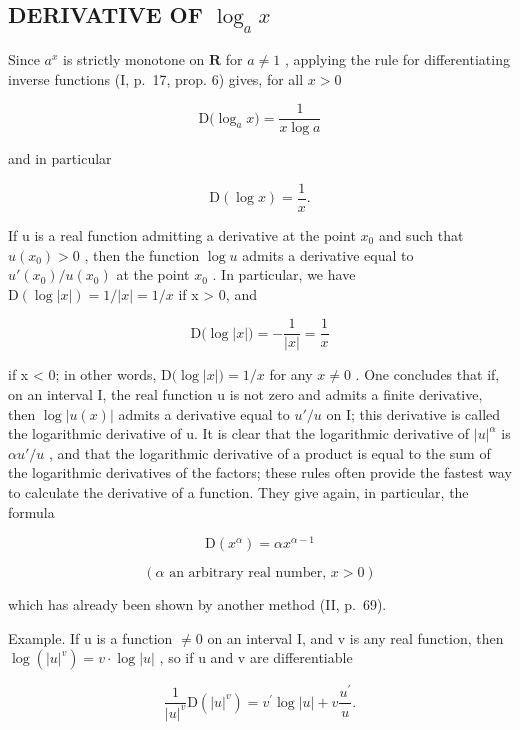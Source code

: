 \subsection{\texorpdfstring{DERIVATIVE OF \(\log_a x\)}{DERIVATIVE OF LOG BASE A OF X}}

Since \(a^x\) is strictly monotone on \(\mathbf{R}\) for \(a \neq 1\) , applying the rule for differentiating inverse functions (I, p.~17, prop. 6) gives, for all \(x > 0\)

\[
\mathrm{D} \big (\log_ {a} x \big) = \frac {1}{x \log a}\tag{9}
\]

and in particular

\[
\mathrm{D} (\log x) = \frac {1}{x}.\tag{10}
\]

If u is a real function admitting a derivative at the point \(x_{0}\) and such that \(u(x_{0}) > 0\) , then the function \(\log u\) admits a derivative equal to \(u'(x_{0})/u(x_{0})\) at the point \(x_{0}\) . In particular, we have \(\mathrm{D}\left(\log |x|\right) = 1/|x| = 1/x\) if x \textgreater{} 0, and

\[
\mathrm{D} \big (\log | x | \big) = - \frac {1}{| x |} = \frac {1}{x}
\]

if x \textless{} 0; in other words, \(\mathrm{D}\big(\log|x|\big) = 1/x\) for any \(x \neq 0\) . One concludes that if, on an interval I, the real function u is not zero and admits a finite derivative, then \(\log|u(x)|\) admits a derivative equal to \(u'/u\) on I; this derivative is called the logarithmic derivative of u. It is clear that the logarithmic derivative of \(|u|^{\alpha}\) is \(\alpha u'/u\) , and that the logarithmic derivative of a product is equal to the sum of the logarithmic derivatives of the factors; these rules often provide the fastest way to calculate the derivative of a function. They give again, in particular, the formula

\[
\mathrm{D} \left(x ^ {\alpha}\right) = \alpha x ^ {\alpha - 1}
\]

\[
(\alpha \text {   an   arbitrary   real   number,   } x > 0)\tag{11}
\]

which has already been shown by another method (II, p.~69).

Example. If u is a function \(\neq 0\) on an interval I, and v is any real function, then \(\log(|u|^{v}) = v \cdot \log |u|\) , so if u and v are differentiable

\[
\frac {1}{| u | ^ {v}} \mathrm{D} (| u | ^ {v}) = v ^ {\prime} \log | u | + v \frac {u ^ {\prime}}{u}.
\]

